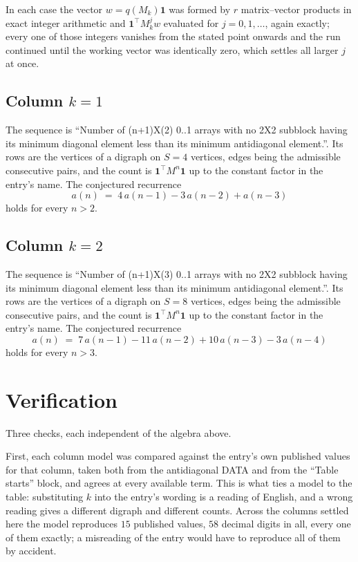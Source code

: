 \documentclass[11pt,a4paper]{article}
\theoremstyle{plain}
\theoremstyle{definition}
\begin{document}
In each case the vector $w=q(M_k)\mathbf{1}$ was formed by $r$ matrix--vector products in
exact integer arithmetic and $\mathbf{1}^{\!\top}M_k^{j}w$ evaluated for $j=0,1,\dots$,
again exactly; every one of those integers vanishes from the stated point onwards and the run
continued until the working vector was identically zero, which settles all larger $j$ at once.

\subsection*{Column $k=1$}
The sequence is ``Number of (n+1)X(2) 0..1 arrays with no 2X2 subblock having its minimum diagonal element less than its minimum antidiagonal element.''. Its rows are the vertices of a digraph on
$S=4$ vertices, edges being the admissible consecutive pairs, and the count is
$\mathbf{1}^{\!\top}M^{n}\mathbf{1}$ up to the constant factor in the entry's name.
The conjectured recurrence
\[
a(n)\;=\;4\,a(n-1) - 3\,a(n-2) + a(n-3)
\]
holds for every $n>2$.

\subsection*{Column $k=2$}
The sequence is ``Number of (n+1)X(3) 0..1 arrays with no 2X2 subblock having its minimum diagonal element less than its minimum antidiagonal element.''. Its rows are the vertices of a digraph on
$S=8$ vertices, edges being the admissible consecutive pairs, and the count is
$\mathbf{1}^{\!\top}M^{n}\mathbf{1}$ up to the constant factor in the entry's name.
The conjectured recurrence
\[
a(n)\;=\;7\,a(n-1) - 11\,a(n-2) + 10\,a(n-3) - 3\,a(n-4)
\]
holds for every $n>3$.

\section{Verification}

Three checks, each independent of the algebra above.

First, each column model was compared against the entry's own published values for that
column, taken both from the antidiagonal DATA and from the ``Table starts'' block, and agrees
at every available term. This is what ties a model to the table: substituting $k$ into the
entry's wording is a reading of English, and a wrong reading gives a different digraph and
different counts. Across the columns settled here the model reproduces $15$ published
values, $58$ decimal digits in all, every one of them exactly; a misreading of the entry
would have to reproduce all of them by accident.
\end{document}
